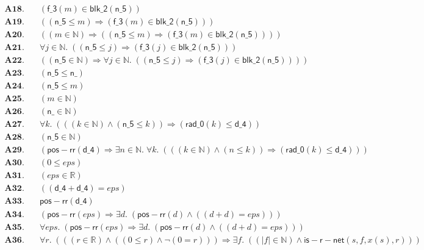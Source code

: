 \documentclass[11pt]{article}
\begin{document}
\begin{align*}
  \mathbf{A18.}\quad & (\mathsf{f\_3}(m) \in \mathsf{blk\_2}(\mathsf{n\_5})) \\
  \mathbf{A19.}\quad & ((\mathsf{n\_5} \leq m) \Rightarrow (\mathsf{f\_3}(m) \in \mathsf{blk\_2}(\mathsf{n\_5}))) \\
  \mathbf{A20.}\quad & ((m \in \mathbb{N}) \Rightarrow ((\mathsf{n\_5} \leq m) \Rightarrow (\mathsf{f\_3}(m) \in \mathsf{blk\_2}(\mathsf{n\_5})))) \\
  \mathbf{A21.}\quad & \forall j \in \mathbb{N}.\; ((\mathsf{n\_5} \leq j) \Rightarrow (\mathsf{f\_3}(j) \in \mathsf{blk\_2}(\mathsf{n\_5}))) \\
  \mathbf{A22.}\quad & ((\mathsf{n\_5} \in \mathbb{N}) \Rightarrow \forall j \in \mathbb{N}.\; ((\mathsf{n\_5} \leq j) \Rightarrow (\mathsf{f\_3}(j) \in \mathsf{blk\_2}(\mathsf{n\_5})))) \\
  \mathbf{A23.}\quad & (\mathsf{n\_5} \leq \mathsf{n\_}) \\
  \mathbf{A24.}\quad & (\mathsf{n\_5} \leq m) \\
  \mathbf{A25.}\quad & (m \in \mathbb{N}) \\
  \mathbf{A26.}\quad & (\mathsf{n\_} \in \mathbb{N}) \\
  \mathbf{A27.}\quad & \forall k.\; (((k \in \mathbb{N}) \wedge (\mathsf{n\_5} \leq k)) \Rightarrow (\mathsf{rad\_0}(k) \leq \mathsf{d\_4})) \\
  \mathbf{A28.}\quad & (\mathsf{n\_5} \in \mathbb{N}) \\
  \mathbf{A29.}\quad & (\mathsf{pos{-}rr}(\mathsf{d\_4}) \Rightarrow \exists n \in \mathbb{N}.\; \forall k.\; (((k \in \mathbb{N}) \wedge (n \leq k)) \Rightarrow (\mathsf{rad\_0}(k) \leq \mathsf{d\_4}))) \\
  \mathbf{A30.}\quad & (0 \leq \mathit{eps}) \\
  \mathbf{A31.}\quad & (\mathit{eps} \in \mathbb{R}) \\
  \mathbf{A32.}\quad & ((\mathsf{d\_4} + \mathsf{d\_4}) = \mathit{eps}) \\
  \mathbf{A33.}\quad & \mathsf{pos{-}rr}(\mathsf{d\_4}) \\
  \mathbf{A34.}\quad & (\mathsf{pos{-}rr}(\mathit{eps}) \Rightarrow \exists d.\; (\mathsf{pos{-}rr}(d) \wedge ((d + d) = \mathit{eps}))) \\
  \mathbf{A35.}\quad & \forall \mathit{eps}.\; (\mathsf{pos{-}rr}(\mathit{eps}) \Rightarrow \exists d.\; (\mathsf{pos{-}rr}(d) \wedge ((d + d) = \mathit{eps}))) \\
  \mathbf{A36.}\quad & \forall r.\; (((r \in \mathbb{R}) \wedge ((0 \leq r) \wedge \neg (0 = r))) \Rightarrow \exists f.\; ((|f| \in \mathbb{N}) \wedge \mathsf{is{-}r{-}net}(s, f, x(s), r))) \\

\end{align*}
\end{document}
